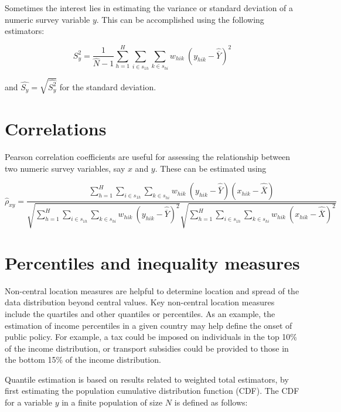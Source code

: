 \documentclass[
  12pt,
]{book}
\begin{document}
Sometimes the interest lies in estimating the variance or standard deviation of a numeric survey variable \(y\). This can be accomplished using the following estimators:

\[
\widehat{S_y^2} = \frac{1}{\widehat{N}-1}
{\sum_{h=1}^{H}\sum_{i \in s_{1h}} \sum_{ k \in s_{hi}}  w_{hik} \ \left( y_{hik} - \widehat{\overline{Y}} \right)^2}
\]

and \(\widehat{S_y} = \sqrt{\widehat{S_y^2}}\) for the standard deviation.

\section{Correlations}\label{correlations}

Pearson correlation coefficients are useful for assessing the relationship between two numeric survey variables, say \(x\) and \(y\). These can be estimated using

\[
\widehat{\rho}_{xy} = \frac {\sum_{h=1}^{H}\sum_{i \in s_{1h}} \sum_{ k \in s_{hi}}  w_{hik} \ \left( y_{hik} - \widehat{\overline{Y}} \right) \left( x_{hik} - \widehat{\overline{X}} \right)} {\sqrt{\sum_{h=1}^{H}\sum_{i \in s_{1h}} \sum_{ k \in s_{hi}}  w_{hik} \ \left( y_{hik} - \widehat{\overline{Y}} \right)^2} \sqrt{\sum_{h=1}^{H}\sum_{i \in s_{1h}} \sum_{ k \in s_{hi}}  w_{hik} \ \left( x_{hik} - \widehat{\overline{X}} \right)^2}}
\]

\section{Percentiles and inequality measures}\label{percentiles-and-inequality-measures}

Non-central location measures are helpful to determine location and spread of the data distribution beyond central values. Key non-central location measures include the quartiles and other quantiles or percentiles. As an example, the estimation of income percentiles in a given country may help define the onset of public policy. For example, a tax could be imposed on individuals in the top 10\% of the income distribution, or transport subsidies could be provided to those in the bottom 15\% of the income distribution.

Quantile estimation is based on results related to weighted total estimators, by first estimating the population cumulative distribution function (CDF). The CDF for a variable \(y\) in a finite population of size \(N\) is defined as follows:
\end{document}
